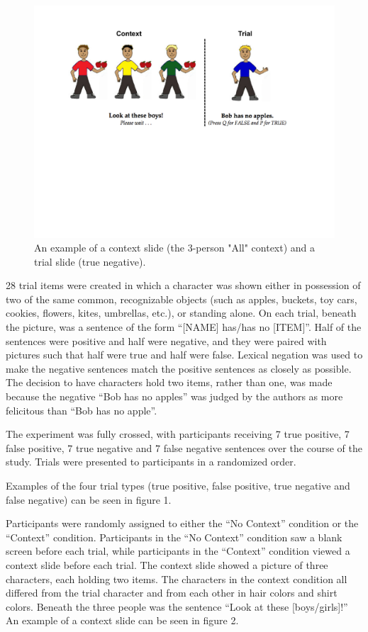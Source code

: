 \documentclass[10pt,letterpaper]{article}
\begin{document}
\begin{figure}[t]
\begin{center} 
\includegraphics[width=3.25inn]{figures/negatron_trialfig2.pdf}
\caption{\label{fig:addition_subs} An example of a context slide (the 3-person "All" context) and a trial slide (true negative). }
\vspace{-5mm}
\end{center} 
\end{figure}

28 trial items were created in which a character was shown either in possession of two of the same common, recognizable objects (such as apples, buckets, toy cars, cookies, flowers, kites, umbrellas, etc.), or standing alone.  On each trial, beneath the picture, was a sentence of the form ``[NAME] has/has no [ITEM]''.  Half of the sentences were positive and half were negative, and they were paired with pictures such that half were true and half were false.  Lexical negation was used to make the negative sentences match the positive sentences as closely as possible.  The decision to have characters hold two items, rather than one, was made because the negative ``Bob has no apples'' was judged by the authors as more felicitous than ``Bob has no apple''.  

The experiment was fully crossed, with participants receiving 7 true positive, 7 false positive, 7 true negative and 7 false negative sentences over the course of the study.  Trials were presented to participants in a randomized order.

Examples of the four trial types (true positive, false positive, true negative and false negative) can be seen in figure 1.    

Participants were randomly assigned to either the ``No Context'' condition or the ``Context'' condition.  Participants in the ``No Context'' condition saw a blank screen before each trial, while participants in the ``Context'' condition viewed a context slide before each trial.  The context slide showed a picture of three characters, each holding two items.  The characters in the context condition all differed from the trial character and from each other in hair colors and shirt colors.  Beneath the three people was the sentence ``Look at these [boys/girls]!''  An example of a context slide can be seen in figure 2.  
\end{document}
